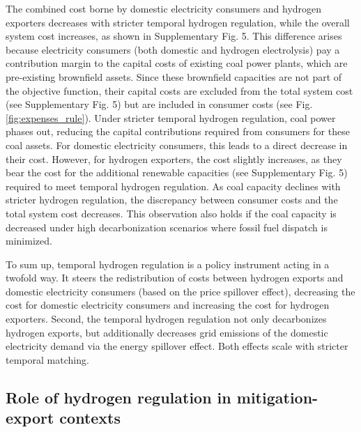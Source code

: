 The combined cost borne by domestic electricity consumers and hydrogen exporters decreases with stricter temporal hydrogen regulation, while the overall system cost increases, as shown in Supplementary Fig. 5. %
This difference arises because electricity consumers (both domestic and hydrogen electrolysis) pay a contribution margin to the capital costs of existing coal power plants, which are pre-existing brownfield assets. Since these brownfield capacities are not part of the objective function, their capital costs are excluded from the total system cost (see Supplementary Fig. 5) but are included in consumer costs (see Fig. \ref{fig:expenses_rule}). %
Under stricter temporal hydrogen regulation, coal power phases out, reducing the capital contributions required from consumers for these coal assets. For domestic electricity consumers, this leads to a direct decrease in their cost. However, for hydrogen exporters, the cost slightly increases, as they bear the cost for the additional renewable capacities (see Supplementary Fig. 5) required to meet temporal hydrogen regulation. %
As coal capacity declines with stricter hydrogen regulation, the discrepancy between consumer costs and the total system cost decreases. This observation also holds if the coal capacity is decreased under high decarbonization scenarios where fossil fuel dispatch is minimized.



To sum up, temporal hydrogen regulation is a policy instrument acting in a twofold way. It steers the redistribution of costs between hydrogen exports and domestic electricity consumers (based on the price spillover effect), decreasing the cost for domestic electricity consumers and increasing the cost for hydrogen exporters. 
Second, the temporal hydrogen regulation 
not only decarbonizes hydrogen exports, but additionally decreases grid emissions of the domestic electricity demand via the energy spillover effect. Both effects scale with stricter temporal matching.



\subsection*{Role of hydrogen regulation in mitigation-export contexts}
\label{subsec:rule_all}


